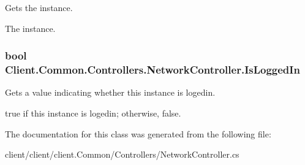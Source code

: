 Gets the instance. 

The instance.\hypertarget{classClient_1_1Common_1_1Controllers_1_1NetworkController_afd2b5bdfc0da3720c3bbb257c0f73d94}{
\subsubsection[{Is\-Logged\-In}]{\setlength{\rightskip}{0pt plus 5cm}bool Client.\-Common.\-Controllers.\-Network\-Controller.\-Is\-Logged\-In\hspace{0.3cm}{\ttfamily [get]}}}\label{classClient_1_1Common_1_1Controllers_1_1NetworkController_afd2b5bdfc0da3720c3bbb257c0f73d94}


Gets a value indicating whether this instance is logedin. 

{\ttfamily true} if this instance is logedin; otherwise, {\ttfamily false}.

The documentation for this class was generated from the following file\-:\begin{DoxyCompactItemize}
\item 
client/client/client.\-Common/\-Controllers/Network\-Controller.\-cs\end{DoxyCompactItemize}
